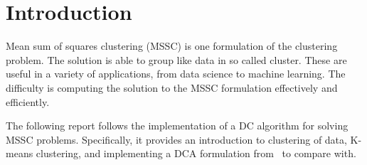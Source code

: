 \section{Introduction}
Mean sum of squares clustering  (MSSC) is one formulation of the clustering problem. The solution is able to group like data in so called cluster. These are useful in a variety of applications, from data science to machine learning. The difficulty is computing the solution to the MSSC formulation effectively and efficiently. 

The following report follows the implementation of a DC algorithm for solving MSSC problems. Specifically, it provides an introduction to clustering of data, K-means clustering, and implementing a DCA formulation from~\cite{an_minimum_2009} to compare with. 
\cite{an_}


